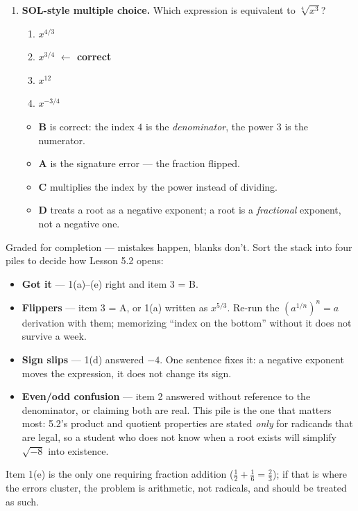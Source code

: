 \documentclass[10pt]{article}
\begin{document}
\begin{enumerate}[leftmargin=1.8em, itemsep=10pt]
  \item \textbf{SOL-style multiple choice.} Which expression is equivalent to $\sqrt[4]{x^{3}}$?
        \begin{enumerate}[label=\Alph*., leftmargin=1.9em, itemsep=1pt]
          \item $x^{4/3}$
          \item $x^{3/4}$ \quad \textcolor{keyred}{\textbf{$\leftarrow$ correct}}
          \item $x^{12}$
          \item $x^{-3/4}$
        \end{enumerate}
        \vspace{2pt}
        \begin{itemize}[leftmargin=1.4em, nosep]
          \item \textbf{B} is correct: the index $4$ is the \emph{denominator}, the power $3$ is the numerator.
          \item \textbf{A} is the signature error --- the fraction flipped.
          \item \textbf{C} multiplies the index by the power instead of dividing.
          \item \textbf{D} treats a root as a negative exponent; a root is a \emph{fractional} exponent, not a negative one.
        \end{itemize}
\end{enumerate}

\begin{teachernote}
Graded for completion --- mistakes happen, blanks don't. Sort the stack into four piles to decide
how Lesson 5.2 opens:
\begin{itemize}[leftmargin=1.3em, nosep]
  \item \textbf{Got it} --- 1(a)--(e) right and item 3 = B.
  \item \textbf{Flippers} --- item 3 = A, or 1(a) written as $x^{5/3}$. Re-run the
        $\left(a^{1/n}\right)^n=a$ derivation with them; memorizing ``index on the bottom'' without
        it does not survive a week.
  \item \textbf{Sign slips} --- 1(d) answered $-4$. One sentence fixes it: a negative exponent moves
        the expression, it does not change its sign.
  \item \textbf{Even/odd confusion} --- item 2 answered without reference to the denominator, or
        claiming both are real. This pile is the one that matters most: 5.2's product and quotient
        properties are stated \emph{only} for radicands that are legal, so a student who does not
        know when a root exists will simplify $\sqrt{-8}$ into existence.
\end{itemize}
Item 1(e) is the only one requiring fraction addition ($\frac12+\frac16=\frac23$); if that is where
the errors cluster, the problem is arithmetic, not radicals, and should be treated as such.
\end{teachernote}
\end{document}
